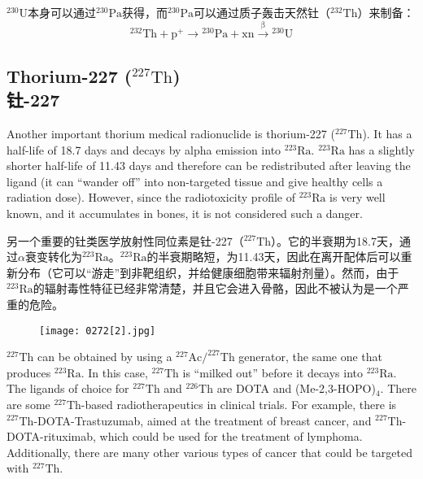 \documentclass[dvipsnames, svgnames,a4paper,11pt]{article}
\begin{document}
\(\mathrm{^{230}U}\)本身可以通过\(\mathrm{^{230}Pa}\)获得，而\(\mathrm{^{230}Pa}\)可以通过质子轰击天然钍（\(\mathrm{^{232}Th}\)）来制备：  
\[\mathrm{^{232}Th} + \mathrm{p^+} \to \mathrm{^{230}Pa} + \mathrm{xn}\xrightarrow{\mathrm{\beta}} \mathrm{^{230}U}\]

\subsection{Thorium-227 (\(\mathrm{^{227}Th}\)) \\钍-227}  
Another important thorium medical radionuclide is thorium-227 (\(\mathrm{^{227}Th}\)). It has a half-life of 18.7 days and decays by alpha emission into \(\mathrm{^{223}Ra}\). \(\mathrm{^{223}Ra}\) has a slightly shorter half-life of 11.43 days and therefore can be redistributed after leaving the ligand (it can “wander off” into non-targeted tissue and give healthy cells a radiation dose). However, since the radiotoxicity profile of \(\mathrm{^{223}Ra}\) is very well known, and it accumulates in bones, it is not considered such a danger.

另一个重要的钍类医学放射性同位素是钍-227（\(\mathrm{^{227}Th}\)）。它的半衰期为18.7天，通过$\alpha$衰变转化为\(\mathrm{^{223}Ra}\)。\(\mathrm{^{223}Ra}\)的半衰期略短，为11.43天，因此在离开配体后可以重新分布（它可以“游走”到非靶组织，并给健康细胞带来辐射剂量）。然而，由于\(\mathrm{^{223}Ra}\)的辐射毒性特征已经非常清楚，并且它会进入骨骼，因此不被认为是一个严重的危险。

\begin{figure}[h]
	\centering
    \texttt{[image: 0272[2].jpg]}  
     \label{fig369}
\end{figure}

\(\mathrm{^{227}Th}\) can be obtained by using a \(\mathrm{^{227}Ac/^{227}Th}\) generator, the same one that produces \(\mathrm{^{223}Ra}\). In this case, \(\mathrm{^{227}Th}\) is “milked out” before it decays into \(\mathrm{^{223}Ra}\). The ligands of choice for \(\mathrm{^{227}Th}\) and \(\mathrm{^{226}Th}\) are DOTA and (Me-2,3-HOPO)\(_{4}\). There are some \(\mathrm{^{227}Th}\)-based radiotherapeutics in clinical trials. For example, there is \(\mathrm{^{227}Th}\)-DOTA-Trastuzumab, aimed at the treatment of breast cancer, and \(\mathrm{^{227}Th}\)-DOTA-rituximab, which could be used for the treatment of lymphoma. Additionally, there are many other various types of cancer that could be targeted with \(\mathrm{^{227}Th}\).
\end{document}
